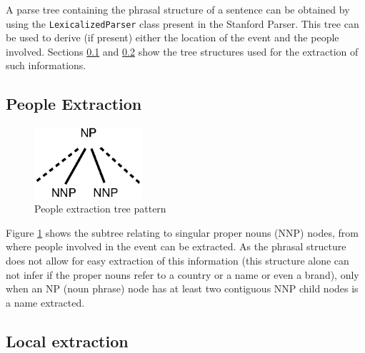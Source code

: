 \documentclass{llncs}
\begin{document}
A parse tree containing the phrasal structure of a sentence can be obtained by using the \verb!LexicalizedParser! class present in the Stanford Parser. This tree can be used to derive (if present) either the location of the event and the people involved. Sections \ref{chp:people-extraction} and \ref{chp:local-extraction} show the tree structures used for the extraction of such informations.

\subsection{People Extraction}
\label{chp:people-extraction}

\begin{figure}[h]
	\centering
	\includegraphics[width=40mm]{dia/people.eps}
	\caption{People extraction tree pattern}
	\label{fig:people-extraction}
\end{figure}

Figure \ref{fig:people-extraction} shows the subtree relating to singular proper nouns (NNP) nodes, from where people involved in the event can be extracted. As the phrasal structure does not allow for easy extraction of this information (this structure alone can not infer if the proper nouns refer to a country or a name or even a brand), only when an NP (noun phrase) node has at least two contiguous NNP child nodes is a name extracted.

\newpage
\subsection{Local extraction}
\label{chp:local-extraction}
\end{document}
